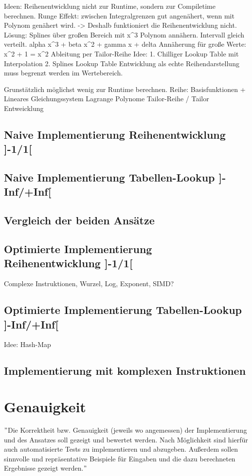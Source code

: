 \documentclass[course=erap]{aspdoc}
\begin{document}
Ideen: Reihenentwicklung nicht zur Runtime, sondern zur Compiletime berechnen.
Runge Effekt: zwischen Integralgrenzen gut angenähert, wenn mit Polynom genähert wird. -> Deshalb funktioniert die Reihenentwicklung nicht.
Lösung: Splines über großen Bereich mit x^3 Polynom annähern. Intervall gleich verteilt. alpha x^3 + beta x^2 + gamma x + delta
Annäherung für große Werte: x^2 + 1 = x^2
Ableitung per Tailor-Reihe
Idee: 1. Chilliger Lookup Table mit Interpolation 2. Splines Lookup Table
Entwicklung als echte Reihendarstellung muss begrenzt werden im Wertebereich.

Grunstätzlich möglichst wenig zur Runtime berechnen.
Reihe: Basisfunktionen + Lineares Gleichungssystem
Lagrange Polynome
Tailor-Reihe / Tailor Entweicklung

\subsection{Naive Implementierung Reihenentwicklung ]-1/1[}

\subsection{Naive Implementierung Tabellen-Lookup ]-Inf/+Inf[}

\subsection{Vergleich der beiden Ansätze}

\subsection{Optimierte Implementierung Reihenentwicklung ]-1/1[}
Complexe Instruktionen, Wurzel, Log, Exponent, SIMD?

\subsection{Optimierte Implementierung Tabellen-Lookup ]-Inf/+Inf[}
Idee: Hash-Map

\subsection{Implementierung mit komplexen Instruktionen}


\section{Genauigkeit}
\("\)Die Korrektheit bzw. Genauigkeit (jeweils wo angemessen) der Implementierung und des Ansatzes
soll gezeigt und bewertet werden.
Nach Möglichkeit sind hierfür auch automatisierte Tests zu implementieren und abzugeben.
Außerdem sollen sinnvolle und repräsentative Beispiele für Eingaben und die dazu berechneten Ergebnisse gezeigt werden.\("\)
\end{document}
